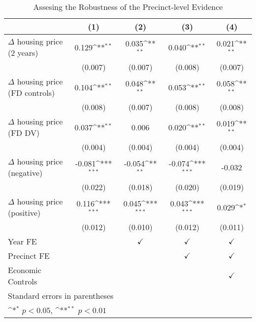 \begin{table}[htbp]\centering
	\def\sym#1{\ifmmode^{#1}\else\(^{#1}\)\fi}
	\caption{Assesing the Robustness of the Precinct-level Evidence} \label{robustness}
	\begin{tabular}{l*{4}{c}}
		\hline\hline
		&\multicolumn{1}{c}{(1)}        &\multicolumn{1}{c}{(2)}        &\multicolumn{1}{c}{(3)}        &\multicolumn{1}{c}{(4)}        \\
\hline
$\Delta$ housing price (2 years)&       0.129\sym{**}&       0.035\sym{**}&       0.040\sym{**}&       0.021\sym{**}\\
&     (0.007)        &     (0.007)        &     (0.008)        &     (0.007)        \\
[1em]
$\Delta$ housing price (FD controls)&       0.104\sym{**}&       0.048\sym{**}&       0.053\sym{**}&       0.058\sym{**}\\
&     (0.008)        &     (0.007)        &     (0.008)        &     (0.008)        \\
[1em]
$\Delta$ housing price (FD DV)&       0.037\sym{**}&       0.006        &       0.020\sym{**}&       0.019\sym{**}\\
&     (0.004)        &     (0.004)        &     (0.004)        &     (0.004)        \\
[1em]
$\Delta$ housing price (negative)&      -0.081\sym{***}&      -0.054\sym{**} &      -0.074\sym{***}&      -0.032         \\
&     (0.022)         &     (0.018)         &     (0.020)         &     (0.019)         \\
[1em]
$\Delta$ housing price (positive)&       0.116\sym{***}&       0.045\sym{***}&       0.043\sym{***}&       0.029\sym{*}  \\
&     (0.012)         &     (0.010)         &     (0.012)         &     (0.011)         \\
[1em]
\hline Year FE  &                    & $\checkmark$                    &$\checkmark$        &$\checkmark$        \\
[1em]
Precinct FE  &                    &                    &$\checkmark$        &$\checkmark$        \\
[1em]
Economic Controls             &                    &                    &                    &$\checkmark$        \\
\hline\hline
\multicolumn{5}{l}{\footnotesize Standard errors in parentheses}\\
\multicolumn{5}{l}{\footnotesize \sym{*} \(p<0.05\), \sym{**} \(p<0.01\)}\\
\end{tabular}
\end{table}